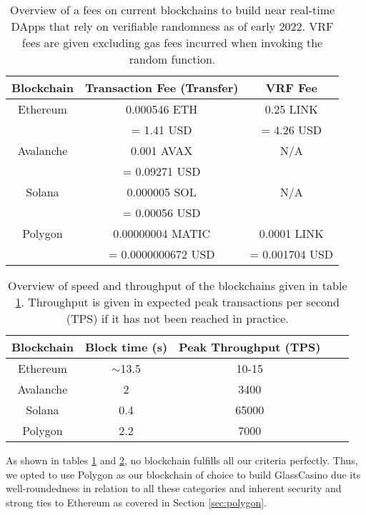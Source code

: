 \documentclass[10pt,journal,compsoc]{IEEEtran}
\begin{document}
\begin{table}[!h]
    \centering
    \renewcommand{\arraystretch}{1.3}
    \caption{Overview of a fees on current blockchains to build near real-time DApps that rely on verifiable randomness as of early 2022. VRF fees are given excluding gas fees incurred when invoking the random function.}
    \label{tab:blockfees}
    \begin{tabular}{c | c c}
        \hline\hline
        Blockchain & Transaction Fee (Transfer) & VRF Fee \\ 
        \hline
        Ethereum & 0.000546 ETH & 0.25 LINK\\
         & = 1.41 USD & = 4.26 USD \\
        \hline
        Avalanche & 0.001 AVAX & N/A\\
        &  = 0.09271 USD & \\
        \hline
        Solana & 0.000005 SOL & N/A\\
         &  = 0.00056 USD & \\
         \hline
        Polygon & 0.00000004 MATIC & 0.0001 LINK \\
         & = 0.0000000672 USD & = 0.001704 USD \\
        \hline\hline
    \end{tabular}
\end{table}

\begin{table}[!h]
    \centering
    \renewcommand{\arraystretch}{1.3}
    \caption{Overview of speed and throughput of the blockchains given in table \ref{tab:blockfees}. Throughput is given in expected peak transactions per second (TPS) if it has not been reached in practice.}
    \label{tab:blocktimes}
    \begin{tabular}{c | c c c c}
        \hline\hline
        Blockchain & Block time (s) & Peak Throughput (TPS) \\ 
        \hline
        Ethereum & $\sim$13.5 & 10-15\\
        Avalanche & 2 & 3400\\
        Solana & 0.4 & 65000\\
        Polygon & 2.2 & 7000\\
        \hline\hline
    \end{tabular}
\end{table}

As shown in tables \ref{tab:blockfees} and \ref{tab:blocktimes}, no blockchain fulfills all our criteria perfectly. Thus, we opted to use Polygon as our blockchain of choice to build GlassCasino due its well-roundedness in relation to all these categories and inherent security and strong ties to Ethereum as covered in Section \ref{sec:polygon}.
\end{document}
